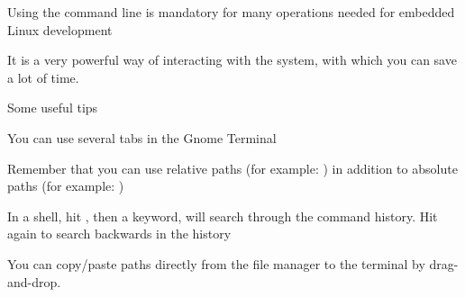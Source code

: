   \startitemize
  \item Using the command line is mandatory for many operations needed
    for embedded Linux development
  \item It is a very powerful way of interacting with the system, with
    which you can save a lot of time.
  \item Some useful tips
    \startitemize
    \item You can use several tabs in the Gnome Terminal
    \item Remember that you can use relative paths (for example:
      ) in addition to absolute paths (for example:
      )
    \item In a shell, hit \type{[Control] [r]}, then a keyword, will
      search through the command history. Hit \type{[Control] [r]}
      again to search backwards in the history
    \item You can copy/paste paths directly from the file manager to
      the terminal by drag-and-drop.
    \stopitemize
  \stopitemize


